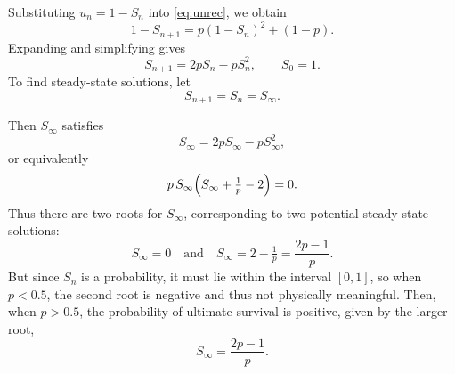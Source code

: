 \documentclass[11pt]{article}
\begin{document}
Substituting $u_n = 1 - S_n$ into \eqref{eq:unrec}, we obtain
\[
1 - S_{n+1} = p (1 - S_n)^2 + (1 - p).
\]
Expanding and simplifying gives
\begin{equation}
S_{n+1}
= 2p S_n - p S_n^2,
\qquad S_0 = 1 .
\label{eq:SnIter}
\end{equation}
To find steady-state solutions, let
\[
S_{n+1} = S_n = S_\infty.
\]
\begin{figure}
    \centering
    \vspace{-10pt} %
    \vspace{35pt}
\end{figure}
Then $S_\infty$ satisfies
\[
S_\infty = 2p S_\infty - p S_\infty^2,
\]
or equivalently
\[
p\,S_\infty\Bigl(S_\infty + \tfrac1p - 2\Bigr) = 0.
\]
Thus there are two roots for $S_\infty$, corresponding to two potential steady-state solutions:
\[
S_\infty = 0
\quad\text{and}\quad
S_\infty = 2 - \tfrac1p = \dfrac{2p-1}{p}.
\]
But since $S_n$ is a probability, it must lie within the interval $[0,1]$, so when $p < 0.5$, the second root is negative and thus not physically meaningful.
Then, when $p > 0.5$, the probability of ultimate survival is positive, given by the larger root,
\[
S_\infty = \dfrac{2p-1}{p}.
\]
\end{document}
